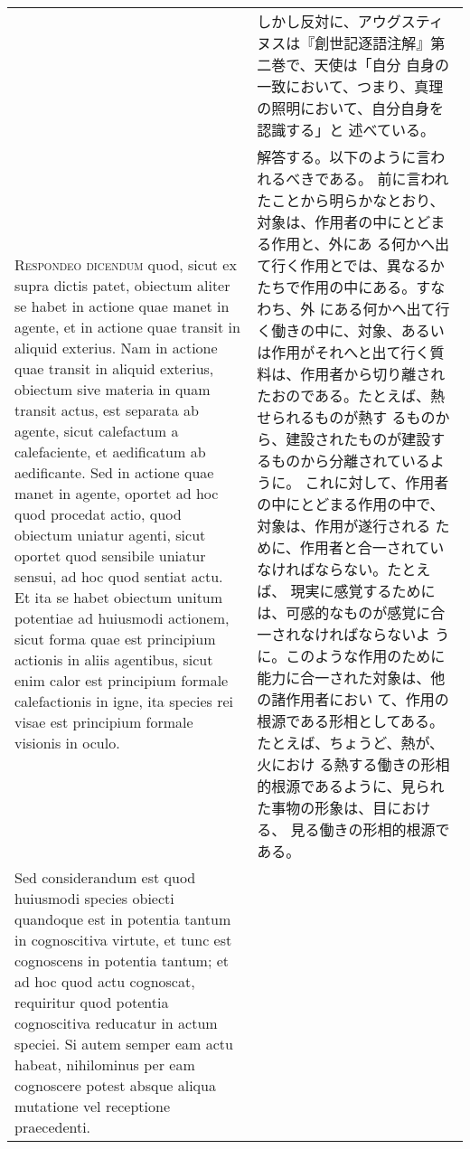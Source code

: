 \documentclass[10pt]{jsarticle} %
\begin{document}
\begin{longtable}{p{21em}p{21em}}
&

しかし反対に、アウグスティヌスは『創世記逐語注解』第二巻で、天使は「自分
 自身の一致において、つまり、真理の照明において、自分自身を認識する」と
 述べている。

\\


{\scshape Respondeo dicendum} quod, sicut ex supra dictis
patet, obiectum aliter se habet in actione quae manet in agente, et in
actione quae transit in aliquid exterius. Nam in actione quae transit in
aliquid exterius, obiectum sive materia in quam transit actus, est
separata ab agente, sicut calefactum a calefaciente, et aedificatum ab
aedificante. Sed in actione quae manet in agente, oportet ad hoc quod
procedat actio, quod obiectum uniatur agenti, sicut oportet quod
sensibile uniatur sensui, ad hoc quod sentiat actu. Et ita se habet
obiectum unitum potentiae ad huiusmodi actionem, sicut forma quae est
principium actionis in aliis agentibus, sicut enim calor est principium
formale calefactionis in igne, ita species rei visae est principium
 formale visionis in oculo.


&

 解答する。以下のように言われるべきである。
 前に言われたことから明らかなとおり、対象は、作用者の中にとどまる作用と、外にあ
 る何かへ出て行く作用とでは、異なるかたちで作用の中にある。すなわち、外
 にある何かへ出て行く働きの中に、対象、あるいは作用がそれへと出て行く質
 料は、作用者から切り離されたおのである。たとえば、熱せられるものが熱す
 るものから、建設されたものが建設するものから分離されているように。
 これに対して、作用者の中にとどまる作用の中で、対象は、作用が遂行される
 ために、作用者と合一されていなければならない。たとえば、
 現実に感覚するためには、可感的なものが感覚に合一されなければならないよ
 うに。このような作用のために能力に合一された対象は、他の諸作用者におい
 て、作用の根源である形相としてある。たとえば、ちょうど、熱が、火におけ
 る熱する働きの形相的根源であるように、見られた事物の形象は、目における、
 見る働きの形相的根源である。

\\



 Sed considerandum est quod huiusmodi species
obiecti quandoque est in potentia tantum in cognoscitiva virtute, et
tunc est cognoscens in potentia tantum; et ad hoc quod actu cognoscat,
requiritur quod potentia cognoscitiva reducatur in actum speciei. Si
autem semper eam actu habeat, nihilominus per eam cognoscere potest
 absque aliqua mutatione vel receptione praecedenti.



\end{longtable}
\end{document}
